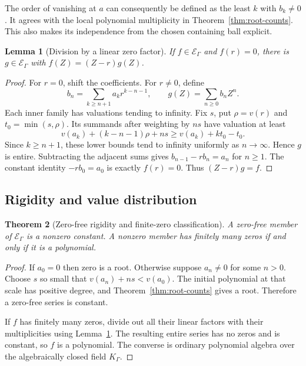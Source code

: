 \documentclass[11pt,letterpaper]{article}
\numberwithin{equation}{section}
\newtheorem{theorem}{Theorem}[section]
\newtheorem{lemma}[theorem]{Lemma}
\theoremstyle{definition}
\theoremstyle{remark}
\begin{document}
The order of vanishing at $a$ can consequently be defined as the least $k$
with $b_k\ne0$. It agrees with the local polynomial multiplicity in
Theorem~\ref{thm:root-counts}. This also makes its independence from the
chosen containing ball explicit.

\begin{lemma}[Division by a linear zero factor]\label{lem:linear-division}
If $f\in\mathcal E_\Gamma$ and $f(r)=0$, there is $g\in\mathcal E_\Gamma$
with $f(Z)=(Z-r)g(Z)$.
\end{lemma}
\begin{proof}
For $r=0$, shift the coefficients. For $r\ne0$, define
\begin{equation}\label{eq:linear-division}
 b_n=\sum_{k\ge n+1}a_kr^{k-n-1},\qquad g(Z)=\sum_{n\ge0}b_nZ^n.
\end{equation}
Each inner family has valuations tending to infinity. Fix $s$, put
$\rho=v(r)$ and $t_0=\min(s,\rho)$. Its summands after weighting by $ns$
have valuation at least
\[
 v(a_k)+(k-n-1)\rho+ns\ge v(a_k)+kt_0-t_0.
\]
Since $k\ge n+1$, these lower bounds tend to infinity uniformly as
$n\to\infty$. Hence $g$ is entire. Subtracting the adjacent sums gives
$b_{n-1}-rb_n=a_n$ for $n\ge1$. The constant identity
$-rb_0=a_0$ is exactly $f(r)=0$. Thus $(Z-r)g=f$.
\end{proof}

\subsection{Rigidity and value distribution}
\begin{theorem}[Zero-free rigidity and finite-zero classification]
\label{thm:zero-free}
A zero-free member of $\mathcal E_\Gamma$ is a nonzero constant.
A nonzero member has finitely many zeros if and only if it is a polynomial.
\end{theorem}
\begin{proof}
If $a_0=0$ then zero is a root. Otherwise suppose $a_n\ne0$ for some $n>0$.
Choose $s$ so small that $v(a_n)+ns<v(a_0)$. The initial polynomial at that
scale has positive degree, and Theorem~\ref{thm:root-counts} gives a root.
Therefore a zero-free series is constant.

If $f$ has finitely many zeros, divide out all their linear factors with their
multiplicities using Lemma~\ref{lem:linear-division}. The resulting entire
series has no zeros and is constant, so $f$ is a polynomial. The converse is
ordinary polynomial algebra over the algebraically closed field $K_\Gamma$.
\end{proof}
\end{document}
